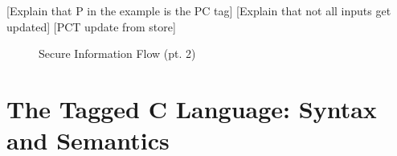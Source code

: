 \documentclass{llncs}
\begin{document}
[Explain that P in the example is the PC tag]
[Explain that not all inputs get updated]
[PCT update from store]

\begin{figure}
\caption{Secure Information Flow (pt. 2)}
\label{fig:example2rules}
\end{figure}


\section{The Tagged C Language: Syntax and Semantics}
\label{sec:language}
\end{document}
